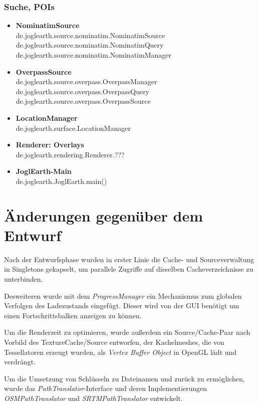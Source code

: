 \documentclass[10pt]{scrreprt}
\begin{document}
\subsection*{Suche, POIs}
\begin{itemize}
\item \textbf{NominatimSource}\\
de.joglearth.source.nominatim.NominatimSource\\
de.joglearth.source.nominatim.NominatimQuery\\
de.joglearth.source.nominatim.NominatimManager
\item \textbf{OverpassSource}\\
de.joglearth.source.overpass.OverpassManager\\
de.joglearth.source.overpass.OverpassQuery\\
de.joglearth.source.overpass.OverpassSource
\item \textbf{LocationManager}\\
de.joglearth.surface.LocationManager
\item \textbf{Renderer: Overlays}\\
de.joglearth.rendering.Renderer.???
\item \textbf{JoglEarth-Main}\\
de.joglearth.JoglEarth.main()
\end{itemize}




\chapter{Änderungen gegenüber dem Entwurf}

Nach der Entwurfsphase wurden in erster Linie die Cache- und Sourceverwaltung in Singletons gekapselt, um parallele Zugriffe auf dieselben Cacheverzeichnisse zu unterbinden.

Desweiteren wurde mit dem \textit{ProgressManager} ein Mechanismus zum globalen Verfolgen des Ladezustands eingefügt. Dieser wird von der GUI benötigt um einen Fortschrittsbalken anzeigen zu können.

Um die Renderzeit zu optimieren, wurde außerdem ein Source/Cache-Paar nach Vorbild des TextureCache/Source entworfen, der Kachelmeshes, die von Tessellatoren erzeugt wurden, als \textit{Vertex Buffer Object} in OpenGL lädt und verdrängt.

Um die Umsetzung von Schlüsseln zu Dateinamen und zurück zu ermöglichen, wurde das \textit{PathTranslator}-Interface und deren Implementierungen \textit{OSMPathTranslator} und \textit{SRTMPathTranslator} entwickelt. 
\end{document}
